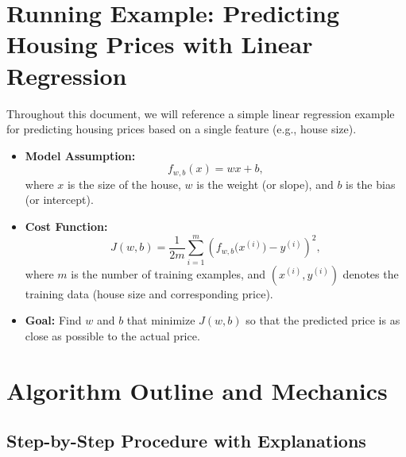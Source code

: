 \documentclass{article}
\begin{document}
\section{Running Example: Predicting Housing Prices with Linear Regression}

Throughout this document, we will reference a simple linear regression example for predicting housing prices based on a single feature (e.g., house size).

\begin{itemize}
    \item \textbf{Model Assumption:} 
    \[
    f_{w,b}(x) = w x + b,
    \]
    where \(x\) is the size of the house, \(w\) is the weight (or slope), and \(b\) is the bias (or intercept).
    \item \textbf{Cost Function:}
    \[
    J(w,b)=\frac{1}{2m}\sum_{i=1}^{m}\left(f_{w,b}\bigl(x^{(i)}\bigr)-y^{(i)}\right)^2,
    \]
    where \(m\) is the number of training examples, and \((x^{(i)}, y^{(i)})\) denotes the training data (house size and corresponding price).
    \item \textbf{Goal:} Find \(w\) and \(b\) that minimize \(J(w,b)\) so that the predicted price is as close as possible to the actual price.
\end{itemize}

\section{Algorithm Outline and Mechanics}

\subsection{Step-by-Step Procedure with Explanations}
\end{document}
